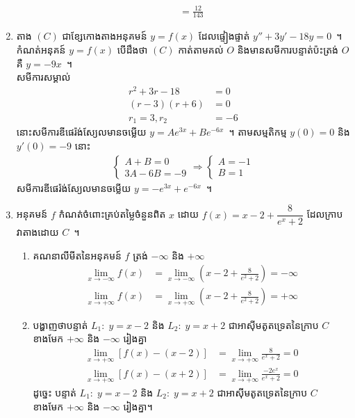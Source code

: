 \documentclass[11pt,a4paper]{myclass}
\begin{document}
\begin{enumerate}
\begin{enumerate}
\begin{align*}
			=\frac{12}{143}
			\end{align*}
		\end{enumerate}
		\item តាង $ (C) $ ជាខ្សែកោងតាងអនុគមន៍ $ y=f(x) $ ដែលផ្ទៀងផ្ទាត់ $ y''+3y'-18y=0 $~។ កំណត់អនុគន៍ $ y=f(x) $ បើដឹងថា $ (C) $ កាត់តាមគល់ $ O $ និងមានសមីការបន្ទាត់ប៉ះត្រង់ $ O $ គឺ $ y=-9x $~។\\
		សមីការសម្គាល់
		\begin{align*}
		r^2+3r-18 &=0\\
		(r-3)(r+6) &=0\\
		r_1=3,r_2&=-6
		\end{align*}
		នោះសមីការឌីផេរ៉ង់ស្យែលមានចម្លើយ $ y=Ae^{3x}+Be^{-6x} $~។ តាមសម្មតិកម្ម $ y(0)=0 $ និង $ y'(0)=-9 $ នោះ
		\begin{align*}
		\begin{cases}
		A+B=0\\
		3A-6B=-9
		\end{cases}
		\Rightarrow
		\begin{cases}
		A=-1\\
		B=1
		\end{cases}
		\end{align*}
		សមីការឌីផេរ៉ង់ស្យែលមានចម្លើយ $ y=-e^{3x}+e^{-6x} $~។
		\item អនុគមន៍ $ f $ កំណត់ចំពោះគ្រប់តម្លៃចំនួនពិត $ x $ ដោយ
		$ f(x)=x-2+\dfrac{8}{e^x+2} $ ដែលក្រាបវាតាងដោយ $ C $~។
		\begin{enumerate}
			\item គណនាលីមីតនៃអនុគមន៍ $ f $ ត្រង់ $ -\infty $ និង $ +\infty $
			\begin{align*}
			\lim\limits_{x\to -\infty}f(x)
			&=\lim\limits_{x\to -\infty} \left( x-2+\frac{8}{e^2+2} \right)=-\infty\\
			\lim\limits_{x\to +\infty}f(x)
			&=\lim\limits_{x\to +\infty} \left( x-2+\frac{8}{e^2+2} \right)=+\infty
			\end{align*}
			\item បង្ហាញថាបន្ទាត់ $ L_1:\;y=x-2 $ និង $ L_2:\;y=x+2 $ ជាអាស៊ីមតូតទ្រេតនៃក្រាប $ C $ ខាងមែក $ +\infty $ និង $ -\infty $ រៀងគ្នា
			\begin{align*}
			\lim\limits_{x\to +\infty}\left[ f(x)-(x-2) \right]
			&=\lim\limits_{x\to +\infty}\frac{8}{e^x+2}=0\\
			\lim\limits_{x\to +\infty}\left[ f(x)-(x+2) \right]
			&=\lim\limits_{x\to +\infty}\frac{-2e^x}{e^x+2}=0
			\end{align*}
			ដូច្នេះ បន្ទាត់ $ L_1:\;y=x-2 $ និង $ L_2:\;y=x+2 $ ជាអាស៊ីមតូតទ្រេតនៃក្រាប $ C $ ខាងមែក $ +\infty $ និង $ -\infty $ រៀងគ្នា។

\end{enumerate}
\end{enumerate}
\end{document}
